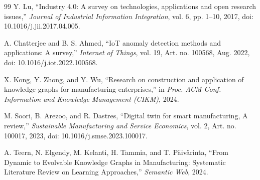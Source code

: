 \begin{thebibliography}{99}
Y. Lu, ``Industry 4.0: A survey on technologies, applications and open research issues,'' \textit{Journal of Industrial Information Integration}, vol. 6, pp. 1--10, 2017, doi: 10.1016/j.jii.2017.04.005.

A. Chatterjee and B. S. Ahmed, ``IoT anomaly detection methods and applications: A survey,'' \textit{Internet of Things}, vol. 19, Art. no. 100568, Aug. 2022, doi: 10.1016/j.iot.2022.100568.

X. Kong, Y. Zhong, and Y. Wu, ``Research on construction and application of knowledge graphs for manufacturing enterprises,'' in \textit{Proc. ACM Conf. Information and Knowledge Management (CIKM)}, 2024.

M. Soori, B. Arezoo, and R. Dastres, ``Digital twin for smart manufacturing, A review,'' \textit{Sustainable Manufacturing and Service Economics}, vol. 2, Art. no. 100017, 2023, doi: 10.1016/j.smse.2023.100017.

A. Teern, N. Elgendy, M. Kelanti, H. Tammia, and T. Päivärinta, ``From Dynamic to Evolvable Knowledge Graphs in Manufacturing: Systematic Literature Review on Learning Approaches,'' \textit{Semantic Web}, 2024.

\end{thebibliography}
